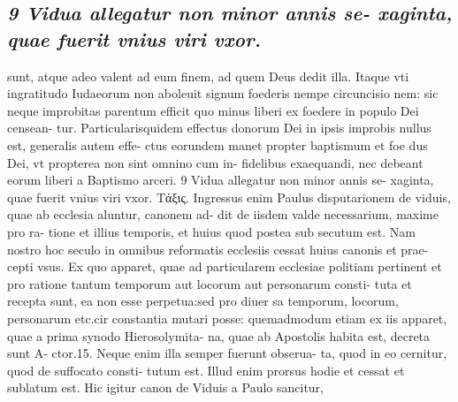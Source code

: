 \documentclass{article}
\begin{document}
\begin{pages}
\subsection*{\textit{9 Vidua allegatur non minor annis se- xaginta, quae fuerit vnius viri vxor.}}sunt, atque adeo valent ad eum finem, ad quem Deus dedit illa. Itaque vti ingratitudo Iudaeorum non aboleuit signum foederis nempe circuncisio nem: sic neque improbitas parentum efficit quo minus liberi ex foedere in populo Dei censean- tur. Particularisquidem effectus donorum Dei in ipsis improbis nullus est, generalis autem effe- ctus eorundem manet propter baptismum et foe dus Dei, vt propterea non sint omnino cum in- fidelibus exaequandi, nec debeant eorum liberi a Baptismo arceri. 9 Vidua allegatur non minor annis se- xaginta, quae fuerit vnius viri vxor. Τάξις. Ingressus enim Paulus disputarionem de viduis, quae ab ecclesia aluntur, canonem ad- dit de iisdem valde necessarium, maxime pro ra- tione et illius temporis, et huius quod postea sub secutum est. Nam nostro hoc seculo in omnibus reformatis ecclesiis cessat huius canonis et prae- cepti vsus. Ex quo apparet, quae ad particularem ecclesiae politiam pertinent et pro ratione tantum temporum aut locorum aut personarum consti- tuta et recepta sunt, ea non esse perpetua:sed pro diuer sa temporum, locorum, personarum etc.cir constantia mutari posse: quemadmodum etiam ex iis apparet, quae a prima synodo Hierosolymita- na, quae ab Apostolis habita est, decreta sunt A- ctor.15. Neque enim illa semper fuerunt obserua- ta, quod in eo cernitur, quod de suffocato consti- tutum est. Illud enim prorsus hodie et cessat et sublatum est. Hic igitur canon de Viduis a Paulo sancitur,  \pend

\end{pages}
\end{document}

